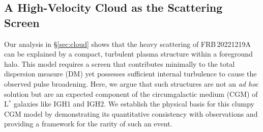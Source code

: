 \documentclass[twocolumn, linenumbers, tra]{aastex631}
\newcommand{\nihari}{FRB\,20221219A } %
\begin{document}


\subsection{A High-Velocity Cloud as the Scattering Screen}
\label{subsec:hvc}

Our analysis in \S\ref{sec:cloud} shows that the heavy scattering of \nihari can be explained by a compact, turbulent plasma structure within a foreground halo. This model requires a screen that contributes minimally to the total dispersion measure (DM) yet possesses sufficient internal turbulence to cause the observed pulse broadening. Here, we argue that such structures are not an \textit{ad hoc} solution but are an expected component of the circumgalactic medium (CGM) of L$^*$ galaxies like IGH1 and IGH2. We establish the physical basis for this clumpy CGM model by demonstrating its quantitative consistency with observations and providing a framework for the rarity of such an event.
\end{document}
